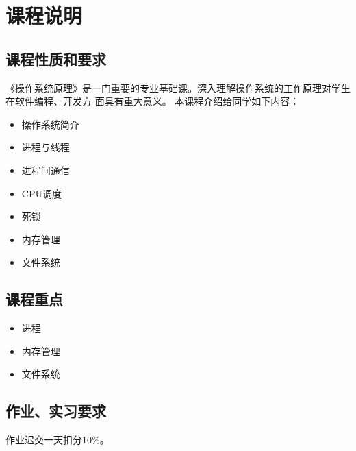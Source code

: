 \documentclass{wx672article}
\begin{document}
\nocite{silberschatz11essentials,tanenbaum2008modern,bovet2005understanding}
\printbibliography[heading=none]{}


\section{课程说明}
\label{sec-2}

\subsection{课程性质和要求}
\label{sec-2-1}

《操作系统原理》是一门重要的专业基础课。深入理解操作系统的工作原理对学生在软件编程、开发方
面具有重大意义。 本课程介绍给同学如下内容：
\begin{itemize}
\item 操作系统简介
\item 进程与线程
\item 进程间通信
\item CPU调度
\item 死锁
\item 内存管理
\item 文件系统
\end{itemize}

\subsection{课程重点}
\label{sec-2-2}

\begin{itemize}
\item 进程
\item 内存管理
\item 文件系统
\end{itemize}

\subsection{作业、实习要求}
\label{sec-2-3}
作业迟交一天扣分10\%。
\end{document}
